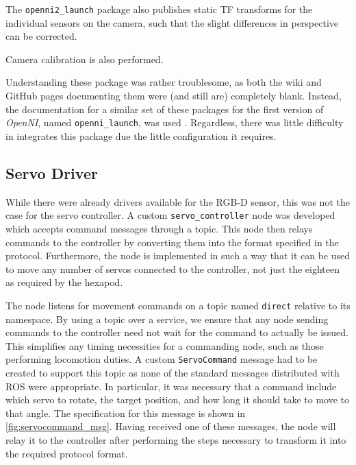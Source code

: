 The \texttt{openni2\_launch} package also publishes static TF transforms for the individual sensors on the camera, such that the slight differences in perspective can be corrected.

Camera calibration is also performed.

Understanding these package was rather troublesome, as both the wiki and GitHub pages documenting them were (and still are) completely blank. Instead, the documentation for a similar set of these packages for the first version of \emph{OpenNI}, named \texttt{openni\_launch}, was used \cite{ros_wiki_openni_launch}. Regardless, there was little difficulty in integrates this package due the little configuration it requires.

\subsection{Servo Driver}

While there were already drivers available for the RGB-D sensor, this was not the case for the servo controller. A custom \texttt{servo\_controller} node was developed which accepts command messages through a topic. This node then relays commands to the controller by converting them into the format specified in the protocol. Furthermore, the node is implemented in such a way that it can be used to move any number of servos connected to the controller, not just the eighteen as required by the hexapod.

The node listens for movement commands on a topic named \texttt{direct} relative to its namespace. By using a topic over a service, we ensure that any node sending commands to the controller need not wait for the command to actually be issued. This simplifies any timing necessities for a commanding node, such as those performing locomotion duties. A custom \texttt{ServoCommand} message had to be created to support this topic as none of the standard messages distributed with ROS were appropriate. In particular, it was necessary that a command include which servo to rotate, the target position, and how long it should take to move to that angle. The specification for this message is shown in \autoref{fig:servocommand_msg}. Having received one of these messages, the node will relay it to the controller after performing the steps necessary to transform it into the required protocol format.


